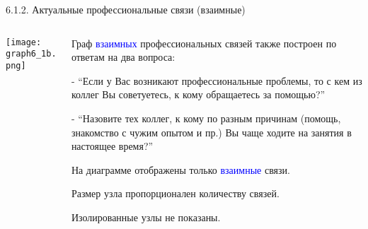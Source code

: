\begin{frame}{6.1.2. Актуальные профессиональные связи (взаимные)}

\begin{columns}
\begin{column}{0.75\textwidth} 
\centering
          \texttt{[image: graph6\_1b.png]}
\end{column}
\begin{column}{0.25\textwidth} 

\tiny
Граф \textcolor{blue}{взаимных} профессиональных связей также построен по ответам на два вопроса:
\smallskip

- ``Если у Вас возникают профессиональные проблемы, то с кем из коллег Вы советуетесь, к кому обращаетесь за помощью?''
\smallskip

- ``Назовите тех коллег, к кому по разным причинам (помощь, знакомство с чужим опытом и пр.) Вы чаще ходите на занятия в настоящее время?''
\smallskip

На диаграмме отображены только \textcolor{blue}{взаимные} связи.
\smallskip

Размер узла пропорционален количеству связей.
\smallskip

Изолированные узлы не показаны.
\end{column}
\end{columns}
\end{frame}


